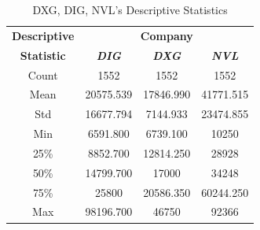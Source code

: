 \documentclass[conference]{IEEEtran}
\begin{document}
\begin{table}[htbp]
\caption{DXG, DIG, NVL’s Descriptive Statistics}
\begin{center}
\begin{tabular}{|c|c|c|c|}
\hline
\textbf{Descriptive}&\multicolumn{3}{|c|}{\textbf{Company}} \\
\cline{2-4} 
\textbf{Statistic} & \textbf{\textit{DIG}}& \textbf{\textit{DXG}}& \textbf{\textit{NVL}} \\
\hline
Count & 1552 & 1552 & 1552  \\
\hline
Mean & 20575.539 & 17846.990 & 41771.515\\
\hline
Std & 16677.794 & 7144.933 & 23474.855\\
\hline
Min & 6591.800 & 6739.100 & 10250\\
\hline
25\% & 8852.700 & 12814.250 & 28928\\
\hline
50\% & 14799.700 & 17000 & 34248\\
\hline
75\% & 25800 & 20586.350 & 60244.250\\
\hline
Max & 98196.700 & 46750 & 92366\\
\hline
\end{tabular}
\label{tab1}
\end{center}
\end{table}
\end{document}
